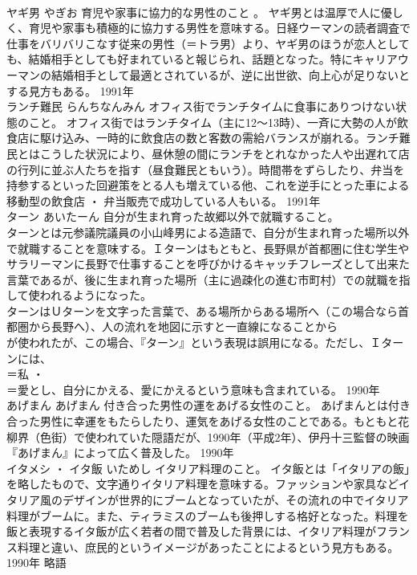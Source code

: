 \documentclass[8pt]{extreport}
\begin{document}
\begin{CJK}{UTF8}{min}
\\	ヤギ男	やぎお	育児や家事に協力的な男性のこと 。	ヤギ男とは温厚で人に優しく、育児や家事も積極的に協力する男性を意味する。日経ウーマンの読者調査で仕事をバリバリこなす従来の男性（＝トラ男）より、ヤギ男のほうが恋人としても、結婚相手としても好まれていると報じられ、話題となった。特にキャリアウーマンの結婚相手として最適とされているが、逆に出世欲、向上心が足りないとする見方もある。	1991年	
\\	ランチ難民	らんちなんみん	オフィス街でランチタイムに食事にありつけない状態のこと。	オフィス街ではランチタイム（主に12～13時）、一斉に大勢の人が飲食店に駆け込み、一時的に飲食店の数と客数の需給バランスが崩れる。ランチ難民とはこうした状況により、昼休憩の間にランチをとれなかった人や出遅れて店の行列に並ぶ人たちを指す（昼食難民ともいう）。時間帯をずらしたり、弁当を持参するといった回避策をとる人も増えている他、これを逆手にとった車による移動型の飲食店 ・ 弁当販売で成功している人もいる。	1991年	
\\	ターン	あいたーん	自分が生まれ育った故郷以外で就職すること。	
\\	ターンとは元参議院議員の小山峰男による造語で、自分が生まれ育った場所以外で就職することを意味する。Ｉターンはもともと、長野県が首都圏に住む学生やサラリーマンに長野で仕事することを呼びかけるキャッチフレーズとして出来た言葉であるが、後に生まれ育った場所（主に過疎化の進む市町村）での就職を指して使われるようになった。 
\\	ターンはＵターンを文字った言葉で、ある場所からある場所へ（この場合なら首都圏から長野へ）、人の流れを地図に示すと一直線になることから
\\	が使われたが、この場合、『ターン』という表現は誤用になる。ただし、Ｉターンには、
\\	＝私 ・ 
\\	＝愛とし、自分にかえる、愛にかえるという意味も含まれている。	1990年	
\\	あげまん	あげまん	付き合った男性の運をあげる女性のこと。	あげまんとは付き合った男性に幸運をもたらしたり、運気をあげる女性のことである。もともと花柳界（色街）で使われていた隠語だが、1990年（平成2年）、伊丹十三監督の映画『あげまん』によって広く普及した。	1990年	
\\	イタメシ ・ イタ飯	いためし	イタリア料理のこと。	イタ飯とは「イタリアの飯」を略したもので、文字通りイタリア料理を意味する。ファッションや家具などイタリア風のデザインが世界的にブームとなっていたが、その流れの中でイタリア料理がブームに。また、ティラミスのブームも後押しする格好となった。料理を飯と表現するイタ飯が広く若者の間で普及した背景には、イタリア料理がフランス料理と違い、庶民的というイメージがあったことによるという見方もある。	1990年	略語	

\end{CJK}
\end{document}
